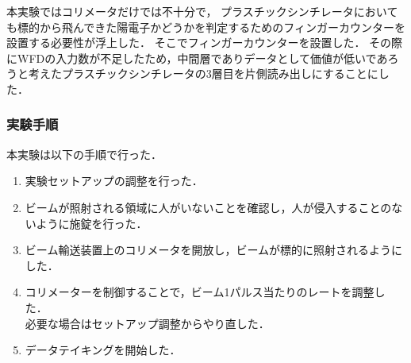 本実験ではコリメータだけでは不十分で，
プラスチックシンチレータにおいても標的から飛んできた陽電子かどうかを判定するためのフィンガーカウンターを設置する必要性が浮上した．
そこでフィンガーカウンターを設置した．
その際にWFDの入力数が不足したため，中間層でありデータとして価値が低いであろうと考えたプラスチックシンチレータの3層目を片側読み出しにすることにした．

\subsubsection{実験手順}
本実験は以下の手順で行った．
\begin{enumerate}
  \item 実験セットアップの調整を行った．
  \item ビームが照射される領域に人がいないことを確認し，人が侵入することのないように施錠を行った．
  \item ビーム輸送装置上のコリメータを開放し，ビームが標的に照射されるようにした．
  \item コリメーターを制御することで，ビーム1パルス当たりのレートを調整した．
    \\必要な場合はセットアップ調整からやり直した．
  \item データテイキングを開始した．
\end{enumerate}
%
